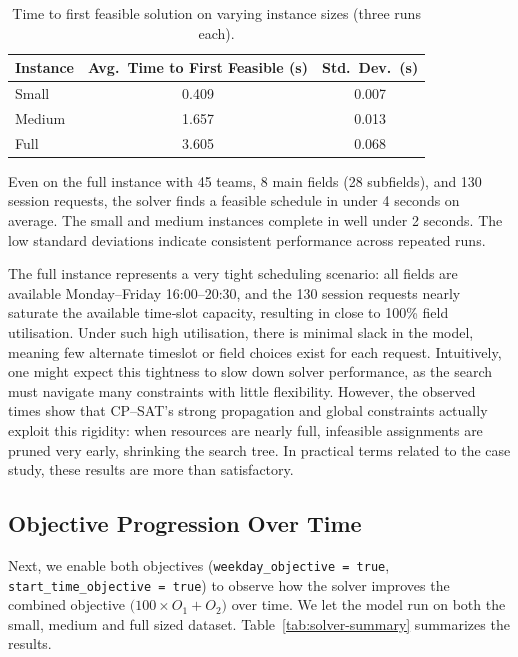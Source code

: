 \documentclass[12pt]{article}
\begin{document}
\begin{table}[h]
  \centering
  \def\arraystretch{1.3}
  \begin{tabularx}{0.75\textwidth}{l  c  c}
    \hline
    \textbf{Instance} & \textbf{Avg.\ Time to First Feasible (s)} & \textbf{Std.\ Dev.\ (s)} \\
    \hline
    Small    & 0.409 & 0.007 \\
    Medium   & 1.657 & 0.013 \\
    Full     & 3.605 & 0.068 \\
    \hline
  \end{tabularx}
  \caption{Time to first feasible solution on varying instance sizes (three runs each).}
  \label{tab:first‐feasible}
\end{table}

\noindent
Even on the full instance with 45 teams, 8 main fields (28 subfields), and 130 session requests, the solver finds a feasible schedule in under 4 seconds on average. The small and medium instances complete in well under 2 seconds. The low standard deviations indicate consistent performance across repeated runs.


The full instance represents a very tight scheduling scenario: all fields are available Monday–Friday 16:00–20:30, and the 130 session requests nearly saturate the available time‐slot capacity, resulting in close to 100\% field utilisation. Under such high utilisation, there is minimal slack in the model, meaning few alternate timeslot or field choices exist for each request. Intuitively, one might expect this tightness to slow down solver performance, as the search must navigate many constraints with little flexibility. However, the observed times show that CP–SAT’s strong propagation and global constraints actually exploit this rigidity: when resources are nearly full, infeasible assignments are pruned very early, shrinking the search tree. In practical terms related to the case study, these results are more than satisfactory. 

\subsection{Objective Progression Over Time}
Next, we enable both objectives (\texttt{weekday\_objective = true}, \texttt{start\_time\_objective = true}) to observe how the solver improves the combined objective $\bigl(100 \times O_1 + O_2\bigr)$ over time. We let the model run on both the small, medium and full sized dataset. Table~\ref{tab:solver-summary} summarizes the results.
\end{document}
